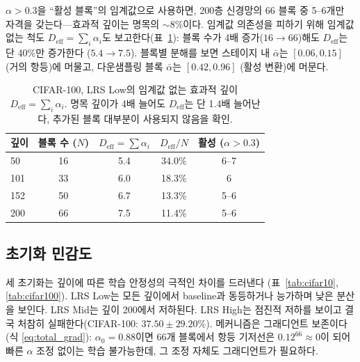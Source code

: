 \documentclass{bmvc2k}
\begin{document}
$\alpha > 0.3$을 ``활성 블록''의 임계값으로 사용하면, 200층 신경망의 66 블록 중 5--6개만 자격을 갖는다---효과적 깊이는 명목의 $\sim$8\%이다. 임계값 의존성을 피하기 위해 임계값 없는 척도 $D_\text{eff} = \sum_i \alpha_i$도 보고한다(표~\ref{tab:deff}): 블록 수가 4배 증가($16 \to 66$)해도 $D_\text{eff}$는 단 40\%만 증가한다 ($5.4 \to 7.5$). 블록별 분해를 보면 스테이지 내 $\bar{\alpha}$는 $[0.06, 0.15]$ (거의 항등)에 머물고, 다운샘플링 블록 $\bar{\alpha}$는 $[0.42, 0.96]$ (활성 변환)에 머문다.

\begin{table}[!ht]
\centering
\small
\caption{CIFAR-100, LRS Low의 임계값 없는 효과적 깊이 $D_\text{eff} = \sum_i \alpha_i$. 명목 깊이가 4배 늘어도 $D_\text{eff}$는 단 1.4배 늘어난다, 추가된 블록 대부분이 사용되지 않음을 확인.}
\label{tab:deff}
\begin{tabular}{lcccc}
\toprule
\textbf{깊이} & \textbf{블록 수} ($N$) & $D_\text{eff} = \sum \alpha_i$ & $D_\text{eff}/N$ & \textbf{활성} ($\alpha{>}0.3$) \\
\midrule
50  & 16 & 5.4 & 34.0\% & 6--7 \\
101 & 33 & 6.0 & 18.3\% & 6 \\
152 & 50 & 6.7 & 13.3\% & 5--6 \\
200 & 66 & 7.5 & 11.4\% & 5--6 \\
\bottomrule
\end{tabular}
\end{table}

\subsection{초기화 민감도}
\label{sec:init_sensitivity}

세 초기화는 깊이에 따른 학습 안정성의 극적인 차이를 드러낸다 (표~\ref{tab:cifar10}, \ref{tab:cifar100}). LRS Low는 모든 깊이에서 baseline과 동등하거나 능가하며 낮은 분산을 보인다. LRS Mid는 깊이 200에서 저하된다. LRS High는 점진적 저하를 보이고 결국 처참히 실패한다(CIFAR-100: $37.50 \pm 29.20\%$). 메커니즘은 그래디언트 보존이다(식 \ref{eq:total_grad}): $\alpha_0 = 0.88$이면 66개 블록에서 항등 기저선은 $0.12^{66} \approx 0$이 되어 빠른 $\alpha$ 조정 없이는 학습 불가능한데, 그 조정 자체도 그래디언트가 필요하다.
\end{document}
